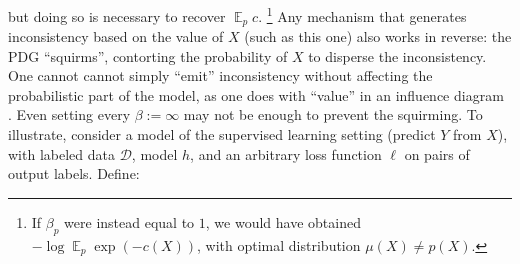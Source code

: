 \documentclass[twoside]{article}
\theoremstyle{plain}
\theoremstyle{definition}
\DeclareMathOperator*{\Ex}{\mathbb{E}} %
\newcommand{\dg}[1]{\mathbdcal{#1}}
\begin{document}
but doing so is necessary to recover $\Ex_p c$.%
\footnote{If $\beta_p$ were instead equal to $1$, we would have obtained $-\log \Ex_p \exp(-c(\!X\!))$, with optimal distribution $\mu(\!X\!) \!\ne\! p(\!X\!)$.\label{fn:logEexp}}
Any mechanism that generates inconsistency based on the value of $X$ (such as this one) also works in reverse:
the PDG ``squirms'', contorting the probability of $X$ to disperse the inconsistency.
One cannot cannot simply ``emit'' inconsistency
without affecting the probabilistic part of the model,
as one does with ``value'' in an influence diagram \parencite{influencediagrams}.
%
%
Even setting every $\beta := \infty$ may not be enough to prevent the squirming.
\def\mypdg{\dg{S}}
To illustrate, consider a model of the supervised learning setting (predict $Y$ from $X$), with labeled data $\mathcal D$, model $h$, and an arbitrary loss function $\ell$ on pairs of output labels. Define:
\vspace{-1ex}
\end{document}
